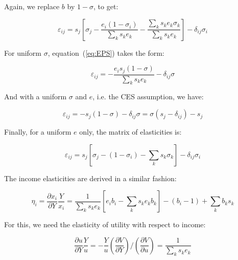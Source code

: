 \noindent Again, we replace $b$ by $1-\sigma$, to get:

\begin{equation}
\label{eq:EPS}
{\varepsilon_{ij}} = {s_j}\left[ {{\sigma_j} - \frac{{{e_i}(1 - {\sigma_i})}}
{{\sum\limits_k {{s_k}{e_k}} }} - \frac{{\sum\limits_k {{s_k}{e_k}{\sigma_k}} }}
{{\sum\limits_k {{s_k}{e_k}} }}} \right] - {\delta_{ij}}{\sigma_i}
\end{equation}

\noindent For uniform $\sigma$, equation~(\ref{eq:EPS}) takes the form:

\begin{equation}
{\varepsilon_{ij}} =  - \frac{{{e_i}{s_j}(1 - \sigma )}}
{{\sum\limits_k {{s_k}{e_k}} }} - {\delta_{ij}}\sigma
\end{equation}

\noindent And with a uniform $\sigma$ and $e$, i.e. the CES assumption, we have:

\begin{equation}
{\varepsilon_{ij}} =  - {s_j}(1 - \sigma ) - {\delta_{ij}}\sigma  =
\sigma ({s_j} - {\delta_{ij}}) - {s_j}
\end{equation}

\noindent Finally, for a uniform $e$ only, the matrix of elasticities is:

\begin{equation}
{\varepsilon_{ij}} = {s_j}\left[ {{\sigma_j} - (1 - {\sigma_i}) -
\sum\limits_k {{s_k}{\sigma_k}} } \right] - {\delta_{ij}}{\sigma_i}
\end{equation}

The income elasticities are derived in a similar fashion:

\begin{equation}
\label{eq:ETA}
\eta_i = \frac{\partial {x_i}} {\partial Y} \frac{Y} {{x_i}} =
   \frac {1} {\sum\limits_k {{s_k} {e_k}}}
   \left[ {e_i}{b_i} - \sum\limits_k {s_k} {e_k}{b_k} \right]
   - ({b_i} - 1) + \sum\limits_k {{b_k}{s_k}}
\end{equation}

\noindent For this, we need the elasticity of utility with respect to income:

\begin{equation}
\label{eq:ETAU}
\frac{{\partial u}}{{\partial Y}}\frac{Y}{u} =  - \frac{Y}{u}\left( {\frac{{\partial V}}
{{\partial Y}}} \right)/\left( {\frac{{\partial V}}{{\partial u}}} \right) =
\frac{1}{{\sum\limits_k {{s_k}{e_k}} }}
\end{equation}

